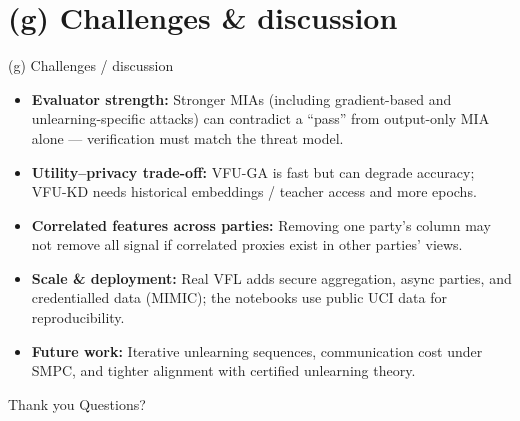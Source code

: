 \documentclass[11pt,aspectratio=169]{beamer}
\begin{document}
\section*{(g) Challenges \& discussion}
\begin{frame}{(g) Challenges / discussion}
  \begin{itemize}
    \item \textbf{Evaluator strength:} Stronger MIAs (including gradient-based and unlearning-specific attacks) can contradict a ``pass'' from output-only MIA alone --- verification must match the threat model.
    \item \textbf{Utility--privacy trade-off:} VFU-GA is fast but can degrade accuracy; VFU-KD needs historical embeddings / teacher access and more epochs.
    \item \textbf{Correlated features across parties:} Removing one party's column may not remove all signal if correlated proxies exist in other parties' views.
    \item \textbf{Scale \& deployment:} Real VFL adds secure aggregation, async parties, and credentialled data (MIMIC); the notebooks use public UCI data for reproducibility.
    \item \textbf{Future work:} Iterative unlearning sequences, communication cost under SMPC, and tighter alignment with certified unlearning theory.
  \end{itemize}
\end{frame}

\begin{frame}{Thank you}
  \centering
  \Large Questions?
\end{frame}
\end{document}
